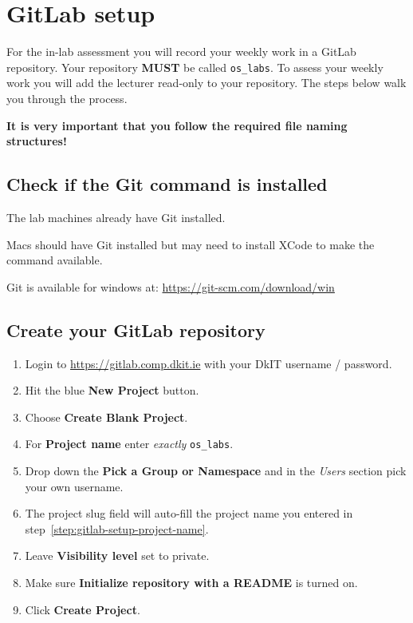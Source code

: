 \chapter{GitLab setup}
\label{ch:gitlab-setup}

For the in-lab assessment you will record your weekly work in a GitLab repository.
Your repository \textbf{MUST} be called \texttt{os\_labs}. 
To assess your weekly work you will add the lecturer read-only to your repository.
The steps below walk you through the process. 

\textbf{It is very important that you follow the required file naming structures!}

\section{Check if the Git command is installed}

The lab machines already have Git installed.

Macs should have Git installed but may need to install XCode to make the command available.

Git is available for windows at:
\url{https://git-scm.com/download/win}


\section{Create your GitLab repository}

\begin{enumerate}
\item Login to \url{https://gitlab.comp.dkit.ie} with your DkIT username / password.
\item Hit the blue \textbf{New Project} button.
\item Choose \textbf{Create Blank Project}.
\item For \textbf{Project name} enter \textit{exactly} \texttt{os\_labs}. \label{step:gitlab-setup-project-name}
\item Drop down the \textbf{Pick a Group or Namespace} and in the \textit{Users} section pick your own username.
\item The project slug field will auto-fill the project name you entered in step~\ref{step:gitlab-setup-project-name}.
\item Leave \textbf{Visibility level} set to private.
\item Make sure \textbf{Initialize repository with a README} is turned on.
\item Click \textbf{Create Project}.
\end{enumerate}

